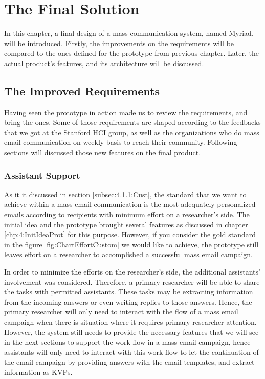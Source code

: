 \chapter{The Final Solution}
\label{chp:5:FinaSolu}
In this chapter, a final design of a mass communication system, named Myriad, will be introduced. Firstly, the improvements on the requirements will be compared to the ones defined for the prototype from previous chapter. Later, the actual product's features, and its architecture will be discussed.

\section{The Improved Requirements}
\label{sec:5.1:ImprRequ}

Having seen the prototype in action made us to review the requirements, and bring the ones. Some of those requirements are shaped according to the feedbacks that we got at the Stanford \ac{HCI} group, as well as the organizations who do mass email communication on weekly basis to reach their community. Following sections will discussed those new features on the final product. 

\subsection{Assistant Support}
\label{subsec:5.1.1:AssiSupp}
As it it discussed in section \ref{subsec:4.1.1:Cust}, the standard that we want to achieve within a mass email communication is the most adequately personalized emails according to recipients with minimum effort on a researcher's side. The initial idea and the prototype brought several features as discussed in chapter \ref{chp:4:InitIdeaProt} for this purpose. However, if you consider the gold standard in the figure \ref{fig:ChartEffortCustom} we would like to achieve, the prototype still leaves effort on a researcher to accomplished a successful mass email campaign.
\vspace{1cm}

In order to minimize the efforts on the researcher's side, the additional assistants' involvement was considered. Therefore, a primary researcher will be able to share the tasks with permitted assistants. These tasks may be extracting information from the incoming answers or even writing replies to those answers. Hence, the primary researcher will only need to interact with the flow of a mass email campaign when there is situation where it requires primary researcher attention. However, the system still needs to provide the necessary features that we will see in the next sections to support the work flow in a mass email campaign, hence assistants will only need to interact with this work flow to let the continuation of the email campaign by providing answers with the email templates, and extract information as \ac{KVP}s.


